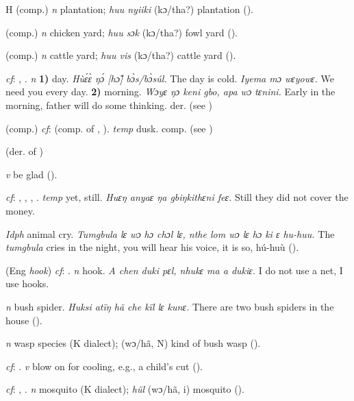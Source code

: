 \begin{letter}{H}
 (comp.) \textit{n} plantation; \textit{huu nyiiki} (kɔ/tha?) plantation (\citealt{Pichl1967}). 

 (comp.) \textit{n} chicken yard; \textit{huu sɔk} (kɔ/tha?) fowl yard (\citealt{Pichl1967}). 

 (comp.) \textit{n} cattle yard; \textit{huu vis} (kɔ/tha?) cattle yard (\citealt{Pichl1967}). 

 \textit{cf}: , . \textit{n} \textbf{1)} day. \textit{Hùɛ́ɛ̀ ŋɔ́ [hɔ̃] bɔ̀s/bɔ̀súl.} The day is cold. \textit{Iyema mɔ wɛyowɛ.} We need you every day. \textbf{2)} morning. \textit{Wɔyɛ ŋɔ keni gbo, apa wɔ tɛnini.} Early in the morning, father will do some thinking. der.  (see \nobreakdash)

 (comp.) \textit{cf}:  (comp. of , ). \textit{temp} dusk. comp.  (see )

 (der. of ) 

 \textit{v} be glad (\citealt{Sumner1921}). 

 \textit{cf}: , , , . \textit{temp} yet, still. \textit{Huɛŋ anyaɛ ŋa gbiŋkithɛni feɛ.} Still they did not cover the money. 

 \textit{Idph} animal cry. \textit{Tumgbula lɛ wɔ hɔ chɔl lɛ, nthe lom wɔ lɛ hɔ ki ɛ hu-huu.} The \textit{tumgbula} cries in the night, you will hear his voice, it is so, hú-huù (\citealt{Pichl1967}).

 (Eng \textit{hook}) \textit{cf}: . \textit{n} hook. \textit{A chen duki pɛl, nhukɛ ma a dukiɛ.} I do not use a net, I use hooks.

 \textit{n} bush spider. \textit{Huksi atïŋ hã che kïl lɛ kunɛ.} There are two bush spiders in the house (\citealt{Pichl1967}). 

 \textit{n} wasp species (K dialect); (wɔ/hã, N) kind of bush wasp (\citealt{Pichl1967}).

 \textit{cf}: . \textit{v} blow on for cooling, e.g., a child's cut (\citealt{Pichl1967}). 

 \textit{cf}: , . \textit{n} mosquito (K dialect); \textit{hũl} (wɔ/hã, i) mosquito (\citealt{Pichl1967}). 


\end{letter}

